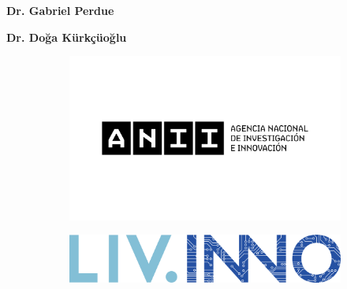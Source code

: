 \begin{titlepage}
\begin{center}
	\normalsize{\textbf{Dr. Gabriel Perdue}}

	\vspace{1.8mm}
 	
	\normalsize{\textbf{Dr. Doğa Kürkçüoğlu}}
\end{center}



\vspace{1mm}
\begin{figure}[!htb]
    \centering    
    \begin{subfigure}[c]{0.43\textwidth}
    	\centering
		\includegraphics[keepaspectratio=true,scale=0.045]{LOGOTIPO ANII + DENOMINACION 01_CMYK.jpg}   
    \end{subfigure}
    \begin{subfigure}[c]{0.43\textwidth}
    	\centering
		\includegraphics[keepaspectratio=true,scale=0.24]{livinno.png}   
    \end{subfigure}
\end{figure}





\end{titlepage}
